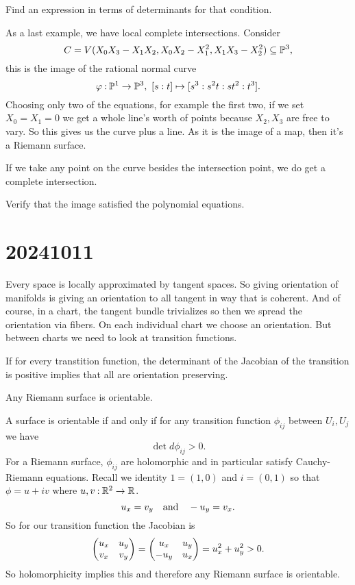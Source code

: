 \documentclass[12pt]{memoir}
\begin{document}
\begin{Ej}
    Find an expression in terms of determinants for that condition.
\end{Ej}

\begin{Ex}
    As a last example, we have local complete intersections. Consider
    $$C=V(X_0X_3-X_1X_2,X_0X_2-X_1^2,X_1X_3-X_2^2)\subseteq\mathbb{P}^3,$$
    this is the image of the rational normal curve 
    $$\vf\:\bP^1\to\bP^3,\ [s:t]\mapsto[s^3:s^2t:st^2:t^3].$$
    Choosing only two of the equations, for example the first two, if we set $X_0=X_1=0$ we get a whole line's worth of points because $X_2,X_3$ are free to vary. So this gives us the curve plus a line. As it is the image of a map, then it's a Riemann surface.\par
    If we take any point on the curve besides the intersection point, we do get a complete intersection.
\end{Ex}

\begin{Ej}
    Verify that the image satisfied the polynomial equations.
\end{Ej}

\section{20241011}

Every space is locally approximated by tangent spaces. So giving orientation of manifolds is giving an orientation to all tangent in way that is coherent. And of course, in a chart, the tangent bundle trivializes so then we spread the orientation via fibers. On each individual chart we choose an orientation. But between charts we need to look at transition functions.\par
If for every transtition function, the determinant of the Jacobian of the transition is positive implies that all are orientation preserving.

\begin{Lem}
Any Riemann surface is orientable.
\end{Lem}

\begin{ptcbp}
A surface is orientable if and only if for any transition function $\phi_{ij}$ between $U_i,U_j$ we have 
$$\det d\phi_{ij}>0.$$
For a Riemann surface, $\phi_{ij}$ are holomorphic and in particular satisfy Cauchy-Riemann equations. Recall we identity $1=(1,0)$ and $i=(0,1)$ so that $\phi=u+iv$ where $u,v\mathbin{:}\mathbb{R}^2\to\mathbb{R}$. 
$$u_x=v_y\quad\text{and}\quad-u_y=v_x.$$
So for our transition function the Jacobian is 
$$\begin{pmatrix} u_x & u_y \\ v_x & v_y \end{pmatrix}=\begin{pmatrix} u_x & u_y \\ -u_y & u_x \end{pmatrix}=u_x^2+u_y^2>0.$$
So holomorphicity implies this and therefore any Riemann surface is orientable. 
\end{ptcbp}
\end{document}
